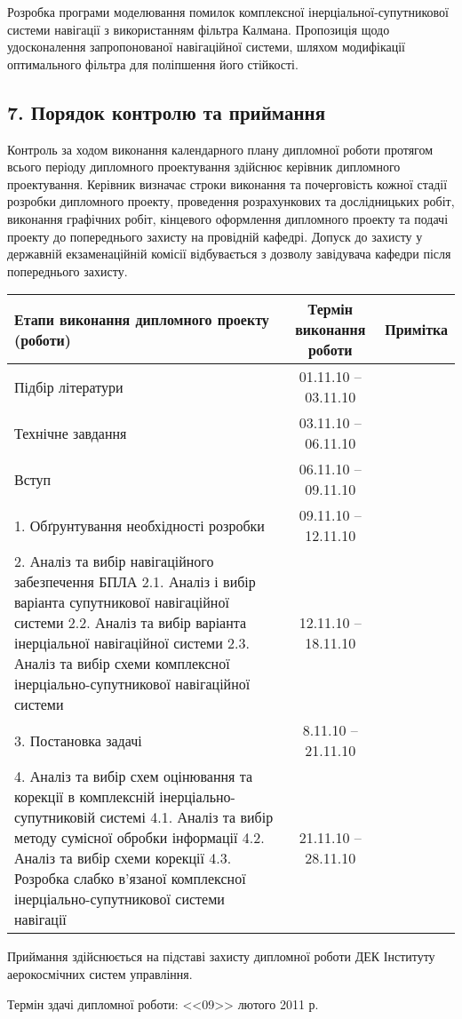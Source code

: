 \documentclass[ukrainian,utf8,simple,floatsingle,hpadding=5mm]{eskdtext}
\begin{document}
Розробка програми моделювання помилок комплексної 
інерціальної-супутникової системи навігації з використанням 
фільтра Калмана. Пропозиція щодо удосконалення запропонованої 
навігаційної системи, шляхом модифікації оптимального фільтра 
для поліпшення його стійкості.

\subsection*{7. Порядок контролю та приймання}
Контроль за ходом виконання календарного плану дипломної роботи протягом 
всього періоду дипломного проектування здійснює керівник дипломного 
проектування. Керівник визначає строки виконання та почерговість кожної 
стадії розробки дипломного проекту, проведення розрахункових та 
дослідницьких робіт, виконання графічних робіт, кінцевого оформлення 
дипломного проекту та подачі проекту до попереднього захисту  на провідній 
кафедрі. Допуск до захисту у державній екзаменаційній комісії відбувається 
з дозволу завідувача кафедри після попереднього захисту.
\footnotesize
\begin{longtable}{|p{5cm}|c|c|}




\hline
\bfseries Етапи виконання дипломного проекту (роботи) & 
\bfseries Термін виконання роботи& \bfseries Примітка  \\


\hline
Підбір літератури
& 01.11.10 – 03.11.10 &  \\ 

\hline
Технічне завдання
& 03.11.10 – 06.11.10 &   \\ 
\hline
Вступ
& 06.11.10 – 09.11.10 &   \\ 
\hline
1. Обґрунтування необхідності розробки
& 09.11.10 – 12.11.10&   \\ 

\hline
2. Аналіз та вибір навігаційного забезпечення БПЛА
2.1. Аналіз і вибір варіанта супутникової навігаційної системи
2.2. Аналіз та вибір варіанта інерціальної навігаційної системи
2.3. Аналіз та вибір схеми комплексної інерціально-супутникової 
навігаційної системи 
& 12.11.10 – 18.11.10&   \\ 

\hline
3. Постановка задачі 
& 8.11.10 – 21.11.10&   \\ 
\hline
4.  Аналіз та вибір схем оцінювання та корекції в комплексній інерціально-супутниковій системі
4.1. Аналіз та вибір методу сумісної обробки інформації
4.2. Аналіз та вибір схеми корекції
4.3. Розробка слабко в’язаної комплексної інерціально-супутникової системи навігації 

&21.11.10 – 28.11.10&   \\ 
\hline




\end{longtable} 


Приймання здійснюється на підставі захисту дипломної роботи ДЕК Інституту 
аерокосмічних систем управління.

Термін здачі дипломної роботи: <<09>> лютого 2011 р.
\end{document}
